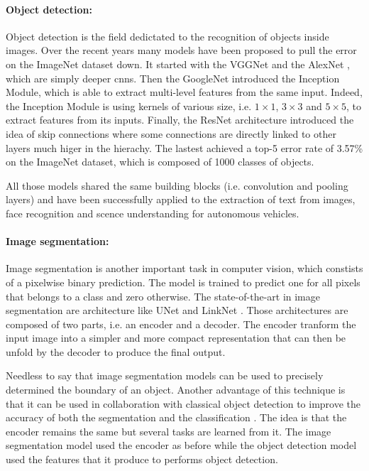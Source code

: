 \documentclass[11pt]{report}
\begin{document}
\paragraph{Object detection:} Object detection is the field dedictated to the recognition of objects inside images. Over the recent years many models have been proposed to pull the error on the ImageNet dataset \cite{imagenet_cvpr09} down. It started with the VGGNet \cite{DBLP:journals/corr/RussakovskyDSKSMHKKBBF14} and the AlexNet \cite{DBLP:journals/cacm/KrizhevskySH17}, which are simply deeper \acrshort{cnn}s. Then the GoogleNet \cite{DBLP:conf/cvpr/SzegedyLJSRAEVR15} introduced the Inception Module, which is able to extract multi-level features from the same input. Indeed, the Inception Module is using kernels of various size, i.e. $1\times1$, $3\times3$ and $5\times5$, to extract features from its inputs. Finally, the ResNet architecture \cite{DBLP:conf/cvpr/HeZRS16} introduced the idea of skip connections where some connections are directly linked to other layers much higer in the hierachy. The lastest achieved a top-5 error rate of 3.57\% on the ImageNet dataset, which is composed of 1000 classes of objects.\newline

\noindent All those models shared the same building blocks (i.e. convolution and pooling layers) and have been successfully applied to the extraction of text from images, face recognition and scence understanding for autonomous vehicles.

\paragraph{Image segmentation:} Image segmentation is another important task in computer vision, which constists of a pixelwise binary prediction. The model is trained to predict one for all pixels that belongs to a class and zero otherwise. The state-of-the-art in image segmentation are architecture like UNet \cite{DBLP:conf/miccai/RonnebergerFB15} and LinkNet \cite{DBLP:conf/vcip/ChaurasiaC17}. Those architectures are composed of two parts, i.e. an encoder and a decoder. The encoder tranform the input image into a simpler and more compact representation that can then be unfold by the decoder to produce the final output.\newline

\noindent Needless to say that image segmentation models can be used to precisely determined the boundary of an object. Another advantage of this technique is that it can be used in collaboration with classical object detection to improve the accuracy of both the segmentation and the classification \cite{DBLP:conf/cvpr/KendallGC18}. The idea is that the encoder remains the same but several tasks are learned from it. The image segmentation model used the encoder as before while the object detection model used the features that it produce to performs object detection.
\end{document}
